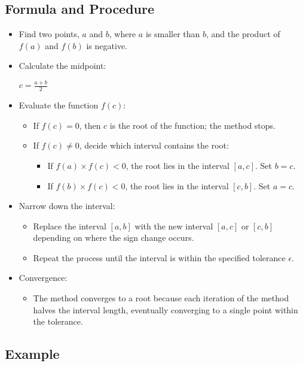 \documentclass[9pt]{extarticle}
\begin{document}
\subsection{Formula and Procedure}
\begin{itemize}
    \item Find two points, $a$ and $b$, where $a$ is smaller than $b$, and the product of $f(a)$ and $f(b)$ is negative.
    \item Calculate the midpoint:
    \begin{center}
        \( c = \frac{a + b}{2} \)
    \end{center}
    \item Evaluate the function $f(c)$:
    \begin{itemize}
        \item If $f(c) = 0$, then $c$ is the root of the function; the method stops.
        \item If $f(c) \neq 0$, decide which interval contains the root:
        \begin{itemize}
            \item If $f(a) \times f(c) < 0$, the root lies in the interval $[a, c]$. Set $b = c$.
            \item If $f(b) \times f(c) < 0$, the root lies in the interval $[c, b]$. Set $a = c$.
        \end{itemize}
    \end{itemize} 
    \item Narrow down the interval:
    \begin{itemize}
        \item Replace the interval $[a, b]$ with the new interval $[a, c]$ or $[c, b]$ depending on where the sign change occurs.
        \item Repeat the process until the interval is within the specified tolerance $\epsilon$.
    \end{itemize}
    \item Convergence:
    \begin{itemize}
        \item The method converges to a root because each iteration of the method halves the interval length, eventually converging to a single point within the tolerance.
    \end{itemize}
\end{itemize}
\subsection{Example}
\end{document}
